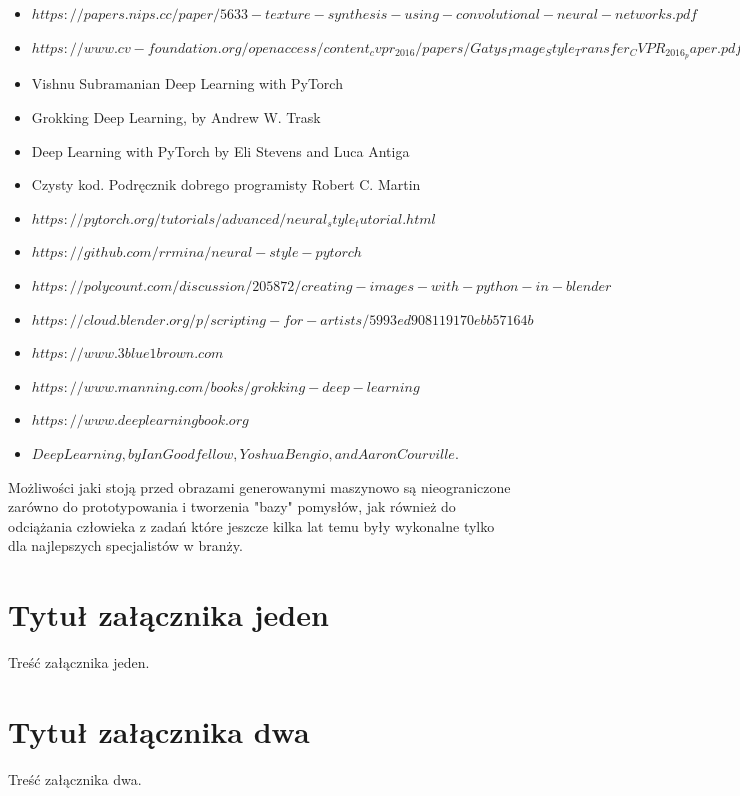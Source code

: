 \documentclass[brudnopis]{xmgr}
\begin{document}
\begin{itemize}
\item $https://papers.nips.cc/paper/5633-texture-synthesis-using-convolutional-neural-networks.pdf$
\item $https://www.cv-foundation.org/openaccess/content_cvpr_2016/papers/Gatys_Image_Style_Transfer_CVPR_2016_paper.pdf$
\item Vishnu Subramanian Deep Learning with PyTorch 
\item Grokking Deep Learning, by Andrew W. Trask
\item Deep Learning with PyTorch by Eli Stevens and Luca Antiga
\item Czysty kod. Podręcznik dobrego programisty Robert C. Martin
\item $https://pytorch.org/tutorials/advanced/neural_style_tutorial.html$
\item$ https://github.com/rrmina/neural-style-pytorch$
\item $https://polycount.com/discussion/205872/creating-images-with-python-in-blender$
\item $https://cloud.blender.org/p/scripting-for-artists/5993ed908119170ebb57164b$
\item $https://www.3blue1brown.com$
\item $https://www.manning.com/books/grokking-deep-learning$
\item $https://www.deeplearningbook.org$
\item $Deep Learning, by Ian Goodfellow, Yoshua Bengio, and Aaron Courville.$


\end{itemize}




\summary
Możliwości jaki stoją przed obrazami generowanymi maszynowo są nieograniczone zarówno do prototypowania i tworzenia "bazy" pomysłów, jak również do odciążania człowieka z zadań które jeszcze kilka lat temu były wykonalne tylko dla najlepszych specjalistów w branży.

\appendix
\chapter{Tytuł załącznika jeden}

Treść załącznika jeden.

\chapter{Tytuł załącznika dwa}

Treść załącznika dwa.





\oswiadczenie
\end{document}
